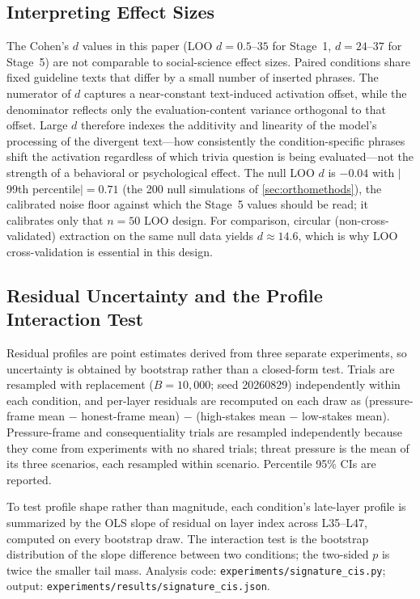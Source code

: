 \documentclass[11pt,letterpaper]{article}
\begin{document}
\subsection{Interpreting Effect Sizes}\label{sec:effectsizes}

The Cohen's $d$ values in this paper (LOO $d=0.5$--$35$ for Stage~1, $d=24$--$37$ for Stage~5) are not
comparable to social-science effect sizes. Paired conditions share fixed guideline texts that differ
by a small number of inserted phrases. The numerator of $d$ captures a near-constant text-induced
activation offset, while the denominator reflects only the evaluation-content variance orthogonal to
that offset. Large $d$ therefore indexes the additivity and linearity of the model's processing of the
divergent text---how consistently the condition-specific phrases shift the activation regardless of
which trivia question is being evaluated---not the strength of a behavioral or psychological effect.
The null LOO $d$ is $-0.04$ with $|$99th percentile$|=0.71$ (the 200 null simulations of
\cref{sec:orthomethods}), the calibrated noise floor against which the Stage~5 values should be read; it calibrates only that
$n=50$ LOO design.
For comparison, circular (non-cross-validated) extraction on the same null data yields $d\approx14.6$,
which is why LOO cross-validation is essential in this design.

\subsection{Residual Uncertainty and the Profile Interaction Test}\label{sec:sigmethods}

Residual profiles are point estimates derived from three separate experiments, so uncertainty is
obtained by bootstrap rather than a closed-form test. Trials are resampled with replacement
($B=10{,}000$; seed 20260829) independently within each condition, and per-layer residuals are
recomputed on each draw as (pressure-frame mean $-$ honest-frame mean) $-$ (high-stakes mean $-$
low-stakes mean). Pressure-frame and consequentiality trials are resampled independently because they
come from experiments with no shared trials; threat pressure is the mean of its three scenarios, each
resampled within scenario. Percentile 95\% CIs are reported.

To test profile shape rather than magnitude, each condition's late-layer profile is summarized by the
OLS slope of residual on layer index across L35--L47, computed on every bootstrap draw. The
interaction test is the bootstrap distribution of the slope difference between two conditions; the
two-sided $p$ is twice the smaller tail mass. Analysis code: \texttt{experiments/signature\_cis.py};
output: \texttt{experiments/results/signature\_cis.json}.
\end{document}
